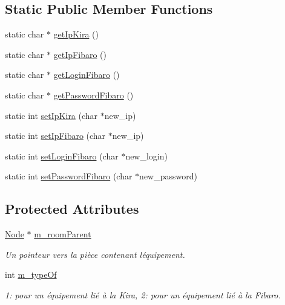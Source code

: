\subsection*{Static Public Member Functions}
\begin{DoxyCompactItemize}
\item 
static char $\ast$ \hyperlink{class_e_p_1_1_equipment_adaffca0c6347dae9c4a50e43964470d7}{get\+Ip\+Kira} ()
\item 
static char $\ast$ \hyperlink{class_e_p_1_1_equipment_a7deb5f2f0fd0298440fd57d6e2e6c07d}{get\+Ip\+Fibaro} ()
\item 
static char $\ast$ \hyperlink{class_e_p_1_1_equipment_a81a3c8902b762f36114f265de34a2f4c}{get\+Login\+Fibaro} ()
\item 
static char $\ast$ \hyperlink{class_e_p_1_1_equipment_abc89eb422fe65d3fd3cba0e0024902ff}{get\+Password\+Fibaro} ()
\item 
static int \hyperlink{class_e_p_1_1_equipment_ad7e1a1a1b42188a16233215a908deca0}{set\+Ip\+Kira} (char $\ast$new\+\_\+ip)
\item 
static int \hyperlink{class_e_p_1_1_equipment_ae947b329b91e6d9cb37b618acc34a2a7}{set\+Ip\+Fibaro} (char $\ast$new\+\_\+ip)
\item 
static int \hyperlink{class_e_p_1_1_equipment_ab2bf8dd407ef5b0d998918cd6ab6a8a3}{set\+Login\+Fibaro} (char $\ast$new\+\_\+login)
\item 
static int \hyperlink{class_e_p_1_1_equipment_ad1abd0762bc1f17283307e6a102f0daa}{set\+Password\+Fibaro} (char $\ast$new\+\_\+password)
\end{DoxyCompactItemize}
\subsection*{Protected Attributes}
\begin{DoxyCompactItemize}
\item 
\hyperlink{class_e_p_1_1_node}{Node} $\ast$ \hyperlink{class_e_p_1_1_equipment_a826ee59574194978cd3e02e8824a0a5a}{m\+\_\+room\+Parent}
\begin{DoxyCompactList}\small\item\em Un pointeur vers la pièce contenant l\textquotesingle{}équipement. \end{DoxyCompactList}\item 
int \hyperlink{class_e_p_1_1_equipment_abf8f83a01b6843ffc15cc8b77254dbe3}{m\+\_\+type\+Of}
\begin{DoxyCompactList}\small\item\em 1\+: pour un équipement lié à la Kira, 2\+: pour un équipement lié à la Fibaro. \end{DoxyCompactList}\end{DoxyCompactItemize}
